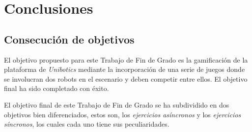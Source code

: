 \documentclass[a4paper, 12pt]{book}
\begin{document}









\cleardoublepage
\chapter{Conclusiones}
\label{chap:conclusiones}


\section{Consecución de objetivos}
\label{sec:consecucion-objetivos}

El objetivo propuesto para este Trabajo de Fin de Grado es la gamificación de la plataforma de \emph{Unibotics} mediante la incorporación de una serie de juegos donde se involucran dos robots en el escenario y deben competir entre ellos. El objetivo final ha sido completado con éxito.

El objetivo final de este Trabajo de Fin de Grado se ha subdividido en dos objetivos bien diferenciados, estos son, los \emph{ejercicios asíncronos} y los \emph{ejercicios síncronos}, los cuales cada uno tiene sus peculiaridades.
\end{document}
